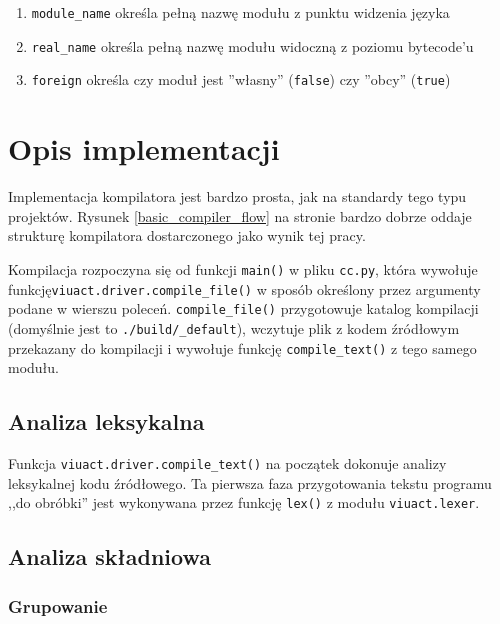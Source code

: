 \begin{enumerate}
    \item \texttt{module\_name} określa pełną nazwę modułu z punktu widzenia języka \ViuAct
    \item \texttt{real\_name} określa pełną nazwę modułu widoczną z poziomu bytecode'u
    \item \texttt{foreign} określa czy moduł jest ''własny'' (\texttt{false}) czy ''obcy'' (\texttt{true})
\end{enumerate}

\section{Opis implementacji}
\label{viuact_cc_implementation_desc}

Implementacja kompilatora jest bardzo prosta, jak na standardy tego typu projektów.
Rysunek \ref{basic_compiler_flow} na stronie \pageref{basic_compiler_flow} bardzo dobrze oddaje strukturę
kompilatora dostarczonego jako wynik tej pracy.

Kompilacja rozpoczyna się od funkcji \texttt{main()} w pliku \texttt{cc.py},
która wywołuje funkcję\newline\texttt{viuact.driver.compile\_file()} w sposób
określony przez argumenty podane w wierszu poleceń.
\texttt{compile\_file()} przygotowuje katalog kompilacji (domyślnie jest to
\texttt{./build/\_default}), wczytuje plik z kodem źródłowym przekazany do
kompilacji i wywołuje funkcję \texttt{compile\_text()} z tego samego modułu.

\subsection{Analiza leksykalna}
\label{viuact_cc_impl_desc_lex}

Funkcja \texttt{viuact.driver.compile\_text()} na początek dokonuje analizy
leksykalnej kodu źródłowego. Ta pierwsza faza przygotowania tekstu programu ,,do
obróbki'' jest wykonywana przez funkcję \texttt{lex()} z modułu
\texttt{viuact.lexer}.

\subsection{Analiza składniowa}
\label{viuact_cc_impl_desc_parse}

\subsubsection{Grupowanie}

